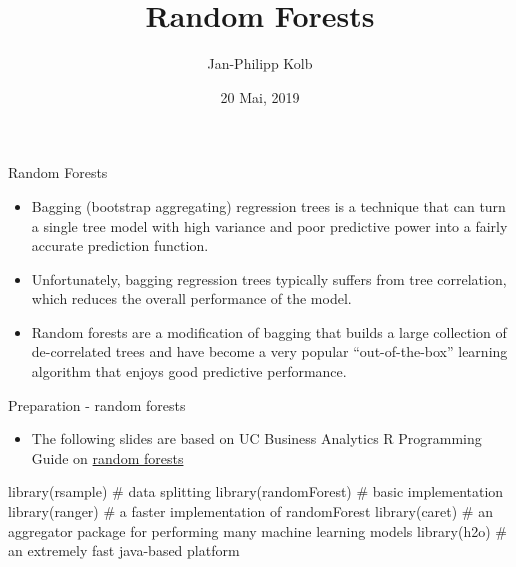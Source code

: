 \documentclass[
  10pt,
  ignorenonframetext,
]{beamer}
\title{Random Forests}
\author{Jan-Philipp Kolb}
\date{20 Mai, 2019}
\newenvironment{Shaded}{}{}
\newcommand{\CommentTok}[1]{\textcolor[rgb]{0.00,0.50,0.00}{#1}}
\newcommand{\KeywordTok}[1]{\textcolor[rgb]{0.00,0.00,1.00}{#1}}
\newcommand{\NormalTok}[1]{#1}
\providecommand{\tightlist}{%
  \setlength{\itemsep}{0pt}\setlength{\parskip}{0pt}}
\begin{document}
\frame{\titlepage}

\begin{frame}{Random Forests}
\protect\hypertarget{random-forests}{}

\begin{itemize}
\tightlist
\item
  Bagging (bootstrap aggregating) regression trees is a technique that
  can turn a single tree model with high variance and poor predictive
  power into a fairly accurate prediction function.
\item
  Unfortunately, bagging regression trees typically suffers from tree
  correlation, which reduces the overall performance of the model.
\item
  Random forests are a modification of bagging that builds a large
  collection of de-correlated trees and have become a very popular
  ``out-of-the-box'' learning algorithm that enjoys good predictive
  performance.
\end{itemize}

\end{frame}

\begin{frame}[fragile]{Preparation - random forests}
\protect\hypertarget{preparation---random-forests}{}

\begin{itemize}
\tightlist
\item
  The following slides are based on UC Business Analytics R Programming
  Guide on \href{http://uc-r.github.io/random_forests}{random forests}
\end{itemize}

\begin{Shaded}
\begin{Highlighting}[]
\KeywordTok{library}\NormalTok{(rsample)      }\CommentTok{# data splitting }
\KeywordTok{library}\NormalTok{(randomForest) }\CommentTok{# basic implementation}
\KeywordTok{library}\NormalTok{(ranger)       }\CommentTok{# a faster implementation of randomForest}
\KeywordTok{library}\NormalTok{(caret)        }\CommentTok{# an aggregator package for performing many machine learning models}
\KeywordTok{library}\NormalTok{(h2o)          }\CommentTok{# an extremely fast java-based platform}
\end{Highlighting}
\end{Shaded}

\end{frame}
\end{document}
